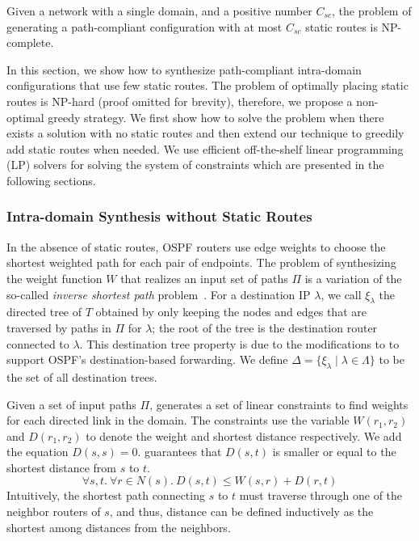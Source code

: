 \iffull
\begin{theorem}
\label{thm:ospfsynth}
Given a
network with a single domain,
and a positive number $C_{sc}$,
the problem of generating
a path-compliant configuration with at most $C_{sc}$ static routes
is NP-complete.
\end{theorem}

\fi

In this section, we show how to synthesize 
path-compliant  intra-domain configurations that
use few static routes.
The problem of optimally placing 
static routes is NP-hard (proof omitted for brevity), 
therefore, we propose a non-optimal greedy strategy.
We first show how to solve the problem when 
there exists a solution with no static routes
and then extend our technique to greedily 
add static routes when needed. We use 
efficient off-the-shelf linear programming (LP) 
solvers for solving the system of constraints 
which are presented in the following sections. 
	

\subsubsection{Intra-domain Synthesis without Static Routes} \label{sec:ospf}\hspace*{4mm}


 
In the absence of static routes,
OSPF routers use edge weights to choose the
shortest weighted path for each pair of endpoints. 
The problem of synthesizing the weight function $W$ that
realizes an input set of paths $\Pi$ is a
variation of the so-called {\em inverse shortest path} 
problem~\cite{isp}. 
For a destination IP $\lambda$, we call $\xi_\lambda$ 
the directed tree of $T$ 
obtained by only keeping the nodes and edges 
that are traversed by paths in $\Pi$ for 
$\lambda$; the root of the tree
is the destination router connected to $\lambda$. 
 This destination tree
 property is due to the modifications to \genesis
 to support OSPF's destination-based forwarding. We
 define $\Delta=\{\xi_\lambda\mid \lambda \in \Lambda\}$ to be 
the set of all destination trees. 

Given a set of input paths $\Pi$, \name 
generates a set of linear constraints to 
find weights 
for each directed link in the domain.
The constraints use the variable $W(r_1, r_2)$ and
$D(r_1, r_2)$ to denote the weight 
and shortest distance respectively. 
We add the equation $D(s, s) = 0$.  
 guarantees that $D(s,t)$ is smaller or equal to
the shortest distance from $s$ to $t$.
\begin{equation} \label{eq:distance}
\forall s, t. ~\forall r \in N(s).~
D(s,t) \leq W(s,r) + D(r,t)
\end{equation}
Intuitively, the shortest path connecting $s$ to $t$
must traverse through one of the neighbor routers of $s$,
and thus, distance can be defined inductively as the 
shortest among distances from the neighbors. 

